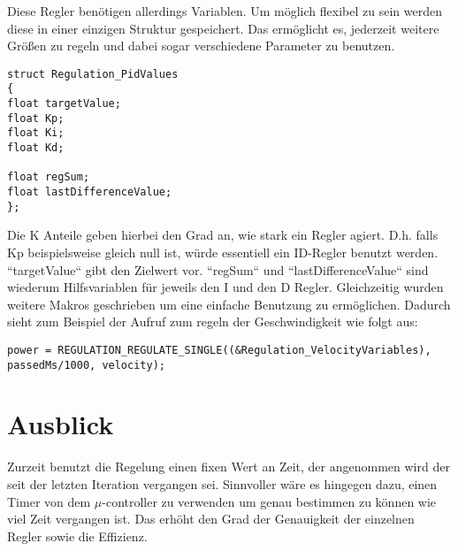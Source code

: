 Diese Regler benötigen allerdings Variablen. Um möglich flexibel zu sein werden diese in einer einzigen Struktur gespeichert. Das ermöglicht es, jederzeit weitere Größen zu regeln und dabei sogar verschiedene Parameter zu benutzen.

\begin{lstlisting}[frame=single, caption=Interne Abstrahierung des Sensorik Interface]
struct Regulation_PidValues
{
float targetValue;
float Kp;
float Ki;
float Kd;

float regSum;
float lastDifferenceValue;
};
\end{lstlisting}
Die K Anteile geben hierbei den Grad an, wie stark ein Regler agiert. D.h. falls Kp beispielsweise gleich null ist, würde essentiell ein ID-Regler benutzt werden.\\
``targetValue`` gibt den Zielwert vor. ``regSum`` und ``lastDifferenceValue`` sind wiederum Hilfsvariablen für jeweils den I und den D Regler.
Gleichzeitig wurden weitere Makros geschrieben um eine einfache Benutzung zu ermöglichen. Dadurch sieht zum Beispiel der Aufruf zum regeln der Geschwindigkeit wie folgt aus:\\
\begin{lstlisting}[frame=single, caption=Interne Abstrahierung des Sensorik Interface]
power = REGULATION_REGULATE_SINGLE((&Regulation_VelocityVariables), passedMs/1000, velocity);
\end{lstlisting}
\section{Ausblick}
Zurzeit benutzt die Regelung einen fixen Wert an Zeit, der angenommen wird der seit der letzten Iteration vergangen sei. Sinnvoller wäre es hingegen dazu, einen Timer von dem $\mu$-controller zu verwenden um genau bestimmen zu können wie viel Zeit vergangen ist. Das erhöht den Grad der Genauigkeit der einzelnen Regler sowie die Effizienz.
